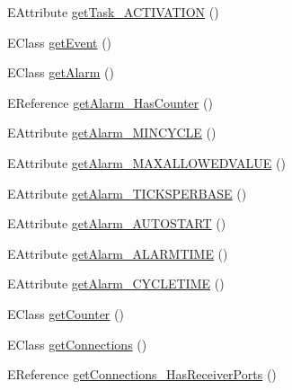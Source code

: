 \begin{DoxyCompactItemize}
\item 
E\-Attribute \hyperlink{interfaceshootingmachineemfmodel_1_1_shootingmachineemfmodel_package_a6cb0ef9358d304cc90461234ff700cac}{get\-Task\-\_\-\-A\-C\-T\-I\-V\-A\-T\-I\-O\-N} ()
\item 
E\-Class \hyperlink{interfaceshootingmachineemfmodel_1_1_shootingmachineemfmodel_package_ac3f35390c2f26e726c768a56d379052c}{get\-Event} ()
\item 
E\-Class \hyperlink{interfaceshootingmachineemfmodel_1_1_shootingmachineemfmodel_package_a83b49bdf97b3b7cd20f8051e755a3b17}{get\-Alarm} ()
\item 
E\-Reference \hyperlink{interfaceshootingmachineemfmodel_1_1_shootingmachineemfmodel_package_a83925dfa61f2c9eb8c5c47956e193733}{get\-Alarm\-\_\-\-Has\-Counter} ()
\item 
E\-Attribute \hyperlink{interfaceshootingmachineemfmodel_1_1_shootingmachineemfmodel_package_adfdf8bd090aad036db076b0c4a3017cb}{get\-Alarm\-\_\-\-M\-I\-N\-C\-Y\-C\-L\-E} ()
\item 
E\-Attribute \hyperlink{interfaceshootingmachineemfmodel_1_1_shootingmachineemfmodel_package_aebf4ea9144f4cdf31d621ce7e578ad8a}{get\-Alarm\-\_\-\-M\-A\-X\-A\-L\-L\-O\-W\-E\-D\-V\-A\-L\-U\-E} ()
\item 
E\-Attribute \hyperlink{interfaceshootingmachineemfmodel_1_1_shootingmachineemfmodel_package_ae7600c8ca0a9195d693d94e1656368fa}{get\-Alarm\-\_\-\-T\-I\-C\-K\-S\-P\-E\-R\-B\-A\-S\-E} ()
\item 
E\-Attribute \hyperlink{interfaceshootingmachineemfmodel_1_1_shootingmachineemfmodel_package_a50821a52c50a7534425ec4c80717ec71}{get\-Alarm\-\_\-\-A\-U\-T\-O\-S\-T\-A\-R\-T} ()
\item 
E\-Attribute \hyperlink{interfaceshootingmachineemfmodel_1_1_shootingmachineemfmodel_package_aacc99d1def2a953675902eeb695c03ec}{get\-Alarm\-\_\-\-A\-L\-A\-R\-M\-T\-I\-M\-E} ()
\item 
E\-Attribute \hyperlink{interfaceshootingmachineemfmodel_1_1_shootingmachineemfmodel_package_a48f85faac1af8eb7d92ee3053c00ce0c}{get\-Alarm\-\_\-\-C\-Y\-C\-L\-E\-T\-I\-M\-E} ()
\item 
E\-Class \hyperlink{interfaceshootingmachineemfmodel_1_1_shootingmachineemfmodel_package_adb1821e14aa48a86a4e0a95703544230}{get\-Counter} ()
\item 
E\-Class \hyperlink{interfaceshootingmachineemfmodel_1_1_shootingmachineemfmodel_package_adcfb239daa13075d25d4b55b1c5bdda2}{get\-Connections} ()
\item 
E\-Reference \hyperlink{interfaceshootingmachineemfmodel_1_1_shootingmachineemfmodel_package_a940cd2471e8ba55f32a6c4a6bafc7c9c}{get\-Connections\-\_\-\-Has\-Receiver\-Ports} ()

\end{DoxyCompactItemize}
